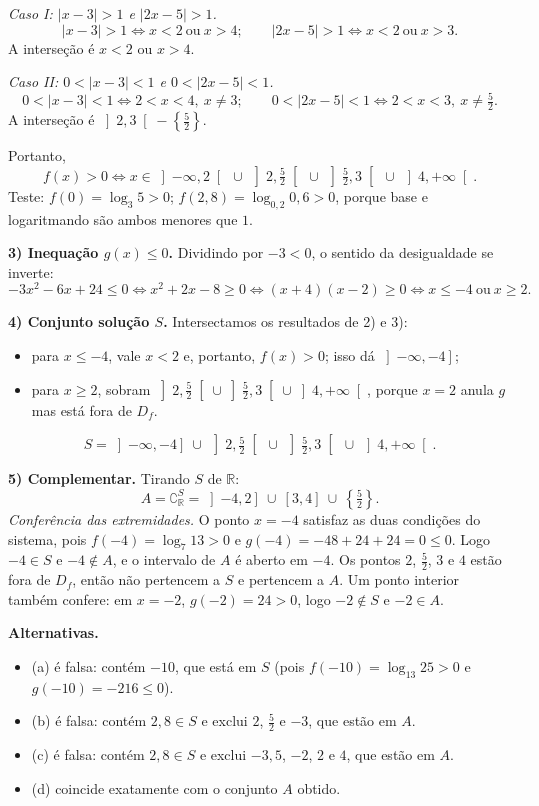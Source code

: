 \documentclass{article}%
\begin{document}
\emph{Caso I: $|x-3|>1$ e $|2x-5|>1$.}
\[
|x-3|>1 \iff x<2 \ \text{ou}\ x>4; \qquad |2x-5|>1 \iff x<2 \ \text{ou}\ x>3 .
\]
A interseção é $x<2$ ou $x>4$.

\emph{Caso II: $0<|x-3|<1$ e $0<|2x-5|<1$.}
\[
0<|x-3|<1 \iff 2<x<4,\ x\neq 3; \qquad 0<|2x-5|<1 \iff 2<x<3,\ x\neq \tfrac{5}{2}.
\]
A interseção é $\left]2,3\right[-\left\{\tfrac{5}{2}\right\}$.

Portanto,
\[
f(x)>0 \iff x\in \left]-\infty,2\right[\ \cup\ \left]2,\tfrac{5}{2}\right[\ \cup\ \left]\tfrac{5}{2},3\right[\ \cup\ \left]4,+\infty\right[ .
\]
Teste: $f(0)=\log_3 5>0$; $f(2{,}8)=\log_{0{,}2}0{,}6>0$, porque base e logaritmando são ambos menores que $1$.

\textbf{3) Inequação $g(x)\le 0$.} Dividindo por $-3<0$, o sentido da desigualdade se inverte:
\[
-3x^2-6x+24\le 0 \iff x^2+2x-8\ge 0 \iff (x+4)(x-2)\ge 0 \iff x\le -4 \ \text{ou}\ x\ge 2 .
\]

\textbf{4) Conjunto solução $S$.} Intersectamos os resultados de 2) e 3):
\begin{itemize}
\item para $x\le -4$, vale $x<2$ e, portanto, $f(x)>0$; isso dá $\left]-\infty,-4\right]$;
\item para $x\ge 2$, sobram $\left]2,\tfrac{5}{2}\right[\cup\left]\tfrac{5}{2},3\right[\cup\left]4,+\infty\right[$, porque $x=2$ anula $g$ mas está fora de $D_f$.
\end{itemize}
\[
S=\left]-\infty,-4\right]\ \cup\ \left]2,\tfrac{5}{2}\right[\ \cup\ \left]\tfrac{5}{2},3\right[\ \cup\ \left]4,+\infty\right[ .
\]

\textbf{5) Complementar.} Tirando $S$ de $\mathbb{R}$:
\[
A=\complement_{\mathbb{R}}^{S}=\left]-4,2\right]\ \cup\ \left[3,4\right]\ \cup\ \left\{\tfrac{5}{2}\right\}.
\]
\emph{Conferência das extremidades.} O ponto $x=-4$ satisfaz as duas condições do sistema, pois $f(-4)=\log_7 13>0$ e $g(-4)=-48+24+24=0\le 0$. Logo $-4\in S$ e $-4\notin A$, e o intervalo de $A$ é aberto em $-4$. Os pontos $2$, $\tfrac{5}{2}$, $3$ e $4$ estão fora de $D_f$, então não pertencem a $S$ e pertencem a $A$. Um ponto interior também confere: em $x=-2$, $g(-2)=24>0$, logo $-2\notin S$ e $-2\in A$.

\textbf{Alternativas.}
\begin{itemize}
\item (a) é falsa: contém $-10$, que está em $S$ (pois $f(-10)=\log_{13}25>0$ e $g(-10)=-216\le 0$).
\item (b) é falsa: contém $2{,}8\in S$ e exclui $2$, $\tfrac{5}{2}$ e $-3$, que estão em $A$.
\item (c) é falsa: contém $2{,}8\in S$ e exclui $-3{,}5$, $-2$, $2$ e $4$, que estão em $A$.
\item (d) coincide exatamente com o conjunto $A$ obtido.
\end{itemize}
\end{document}
